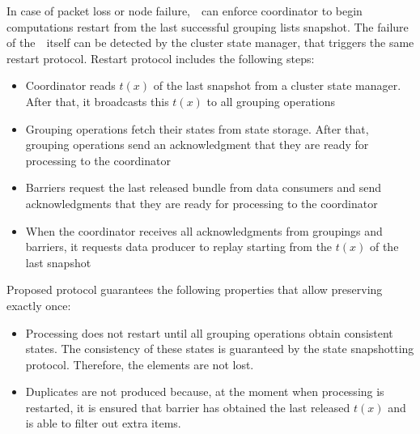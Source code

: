 In case of packet loss or node failure,~\Acker\ can enforce coordinator to begin computations restart from the last successful grouping lists snapshot. The failure of the~\Acker\ itself can be detected by the cluster state manager, that triggers the same restart protocol. Restart protocol includes the following steps:

\begin{itemize}
    \item Coordinator reads $t(x)$ of the last snapshot from a cluster state manager. After that, it broadcasts this $t(x)$ to all grouping operations
    \item Grouping operations fetch their states from state storage. After that, grouping operations send an acknowledgment that they are ready for processing to the coordinator 
    \item Barriers request the last released bundle from data consumers and send acknowledgments that they are ready for processing to the coordinator
    \item When the coordinator receives all acknowledgments from groupings and barriers, it requests data producer to replay starting from the $t(x)$ of the last snapshot  
\end{itemize}

Proposed protocol guarantees the following properties that allow preserving exactly once:

\begin{itemize}
    \item Processing does not restart until all grouping operations obtain consistent states. The consistency of these states is guaranteed by the state snapshotting protocol. Therefore, the elements are not lost.
    \item Duplicates are not produced because, at the moment when processing is restarted, it is ensured that barrier has obtained the last released $t(x)$ and is able to filter out extra items.
\end{itemize}